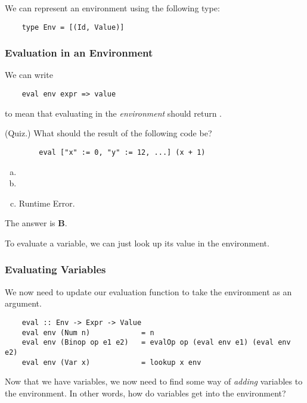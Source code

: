 \documentclass[letterpaper]{article}
\begin{document}
We can represent an environment using the following type: 
\begin{verbatim}
    type Env = [(Id, Value)]\end{verbatim}

\subsubsection{Evaluation in an Environment}
We can write 
\begin{verbatim}
    eval env expr => value \end{verbatim}
to mean that evaluating  in the \emph{environment}  should return .

\begin{mdframed}[]
    (Quiz.) What should the result of the following code be? 
    \begin{verbatim}
        eval ["x" := 0, "y" := 12, ...] (x + 1)\end{verbatim}
    
    \begin{enumerate}[(a)]
        \item {}
        \item {}
        \item Runtime Error.
    \end{enumerate}

    \begin{mdframed}[]
        The answer is \textbf{B}.
    \end{mdframed}
\end{mdframed}

To evaluate a variable, we can just look up its value in the environment.

\subsubsection{Evaluating Variables}
We now need to update our evaluation function to take the environment as an argument. 
\begin{verbatim}
    eval :: Env -> Expr -> Value 
    eval env (Num n)            = n
    eval env (Binop op e1 e2)   = evalOp op (eval env e1) (eval env e2)
    eval env (Var x)            = lookup x env \end{verbatim}

Now that we have variables, we now need to find some way of \emph{adding} variables to the environment. In other words, how do variables get into the environment? 
\end{document}
